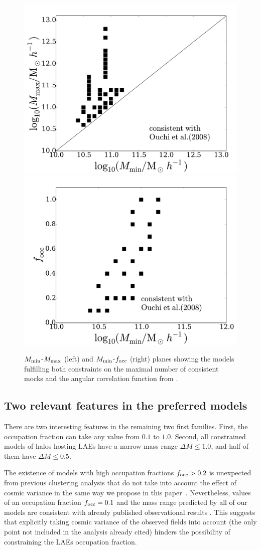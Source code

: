 \documentclass{emulateapj}
\newcommand{\documentname}{paper~}
\begin{document}
\begin{figure}
\begin{center}
\includegraphics[width=0.49\linewidth,angle=0]{Fig6_mass.pdf}
\includegraphics[width=0.49\linewidth,angle=0]{Fig6_f_occ.pdf}
\end{center} 
\caption{$M_{\rm min}$-$M_{\rm max}$ (left) and $M_{\rm
    min}$-$f_{\rm occ}$ (right) planes showing the models fulfilling both
   constraints on the maximal number of consistent mocks and the
  angular correlation function from \citet{Ouchi2008,Ouchi2010}.   
  \label{fig:restriction_mock_and_f_occ_corr}} 
\end{figure} 


\subsection{Two relevant features in the preferred models}

There are two interesting features in the remaining two first
families. First, the occupation fraction can take any value from $0.1$
to $1.0$. Second, all constrained models of halos hosting LAEs 
 have a narrow mass range $\Delta M\leq 1.0$, and half of them 
 have $\Delta M\leq 0.5$.

The existence of models with high occupation fractions $f_{\rm
  occ}>0.2$ is unexpected from previous clustering analysis that do
not take  into account the effect of cosmic variance in the same way we
propose in this \documentname. Nevertheless, values of an occupation
fraction $f_{\rm occ}=0.1$ and the mass range predicted by all of our
models are consistent with already published observational results
\citep{Gawiser07,Ouchi2010}. This suggests that explicitly taking
cosmic variance of the observed fields into account (the only point
not included in the analysis already cited) hinders the possibility of
constraining the LAEs occupation fraction. 
\end{document}
